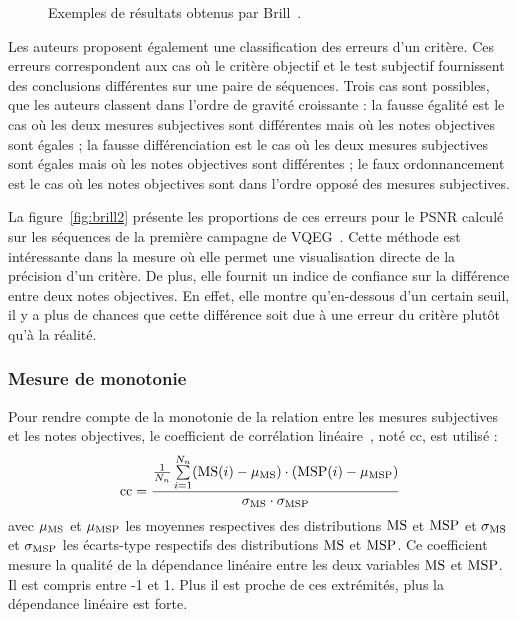 \begin{figure}[htbp]
	\centering
	\hfill
	\caption{Exemples de résultats obtenus par Brill~\cite{brill-spic}.}
	\label{fig:brill}
\end{figure}

Les auteurs proposent également une classification des erreurs d'un critère. Ces erreurs correspondent aux cas où le critère objectif et le test subjectif fournissent des conclusions différentes sur une paire de séquences. Trois cas sont possibles, que les auteurs classent dans l'ordre de gravité croissante : la fausse égalité est le cas où les deux mesures subjectives sont différentes mais où les notes objectives sont égales ; la fausse différenciation est le cas où les deux mesures subjectives sont égales mais où les notes objectives sont différentes ; le faux ordonnancement est le cas où les notes objectives sont dans l'ordre opposé des mesures subjectives.

La figure~\ref{fig:brill2} présente les proportions de ces erreurs pour le PSNR calculé sur les séquences de la première campagne de VQEG~\cite{vqeg-frtv1}. Cette méthode est intéressante dans la mesure où elle permet une visualisation directe de la précision d'un critère. De plus, elle fournit un indice de confiance sur la différence entre deux notes objectives. En effet, elle montre qu'en-dessous d'un certain seuil, il y a plus de chances que cette différence soit due à une erreur du critère plutôt qu'à la réalité.


\subsubsection{Mesure de monotonie}
Pour rendre compte de la monotonie de la relation entre les mesures subjectives et les notes objectives, le coefficient de corrélation linéaire~\cite{pearson-rslpt}, noté cc, est utilisé :
\begin{equation}
\text{cc} = \frac{\frac{1}{N_n}\sum\limits_{i=1}^{N_n} (\text{MS}(i) - \mu_{\text{MS}})\cdot (\text{MSP}(i) - \mu_{\text{MSP}})}{\sigma_{\text{MS}} \cdot \sigma_{\text{MSP}}}
\end{equation}
%
avec $\mu_{\text{MS}}$ et $\mu_{\text{MSP}}$ les moyennes respectives des distributions $\text{MS}$ et $\text{MSP}$ et $\sigma_{\text{MS}}$ et $\sigma_{\text{MSP}}$ les écarts-type respectifs des distributions $\text{MS}$ et $\text{MSP}$. Ce coefficient mesure la qualité de la dépendance linéaire entre les deux variables $\text{MS}$ et $\text{MSP}$. Il est compris entre -1 et 1. Plus il est proche de ces extrémités, plus la dépendance linéaire est forte.


